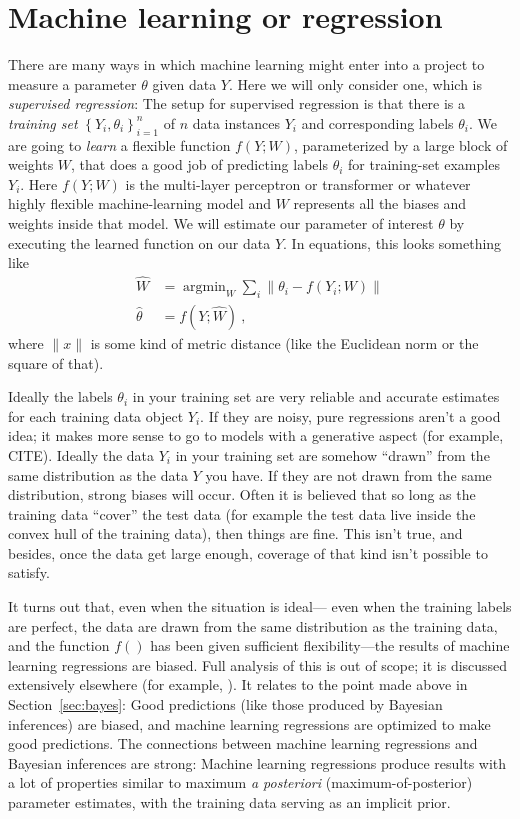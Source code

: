 \documentclass{article}
\newcommand{\sectionname}{Section}
\newcommand{\secref}[1]{\sectionname~\ref{#1}}
\newcommand{\foreign}[1]{\textsl{#1}}
\newcommand{\setof}[1]{\left\{{#1}\right\}}
\newcommand{\norm}[1]{\lVert{#1}\rVert}
\DeclareMathOperator*{\argmin}{argmin}
\begin{document}
\section{Machine learning or regression}\label{sec:ml}
There are many ways in which machine learning might enter into a project to measure a parameter $\theta$ given data $Y$.
Here we will only consider one, which is \emph{supervised regression}:
The setup for supervised regression is that there is a \emph{training set} $\setof{Y_i, \theta_i}_{i=1}^n$ of $n$ data instances $Y_i$ and corresponding labels $\theta_i$.
We are going to \emph{learn} a flexible function $f(Y;W)$, parameterized by a large block of weights $W$, that does a good job of predicting labels $\theta_i$ for training-set examples $Y_i$.
Here $f(Y;W)$ is the multi-layer perceptron or transformer or whatever highly flexible machine-learning model and $W$ represents all the biases and weights inside that model.
We will estimate our parameter of interest $\theta$ by executing the learned function on our data $Y$.
In equations, this looks something like
\begin{align}
    \hat{W} &= \argmin_W \sum_i\norm{\theta_i - f(Y_i;W)} \\
    \hat{\theta} &= f(Y;\hat{W}) ~,
\end{align}
where $\norm{x}$ is some kind of metric distance (like the Euclidean norm or the square of that).

Ideally the labels $\theta_i$ in your training set are very reliable and accurate estimates for each training data object $Y_i$.
If they are noisy, pure regressions aren't a good idea; it makes more sense to go to models with a generative aspect (for example, CITE).
Ideally the data $Y_i$ in your training set are somehow ``drawn'' from the same distribution as the data $Y$ you have.
If they are not drawn from the same distribution, strong biases will occur.
Often it is believed that so long as the training data ``cover'' the test data (for example the test data live inside the convex hull of the training data), then things are fine.
This isn't true, and besides, once the data get large enough, coverage of that kind isn't possible to satisfy.

It turns out that, even when the situation is ideal---%
even when the training labels are perfect, the data are drawn from the same distribution as the training data, and the function $f()$ has been given sufficient flexibility---the results of machine learning regressions are biased.
Full analysis of this is out of scope; it is discussed extensively elsewhere (for example, \cite{goodorbad, ting}).
It relates to the point made above in \secref{sec:bayes}:
Good predictions (like those produced by Bayesian inferences) are biased, and machine learning regressions are optimized to make good predictions.
The connections between machine learning regressions and Bayesian inferences are strong:
Machine learning regressions produce results with a lot of properties similar to maximum \foreign{a posteriori} (maximum-of-posterior) parameter estimates, with the training data serving as an implicit prior.
\end{document}
